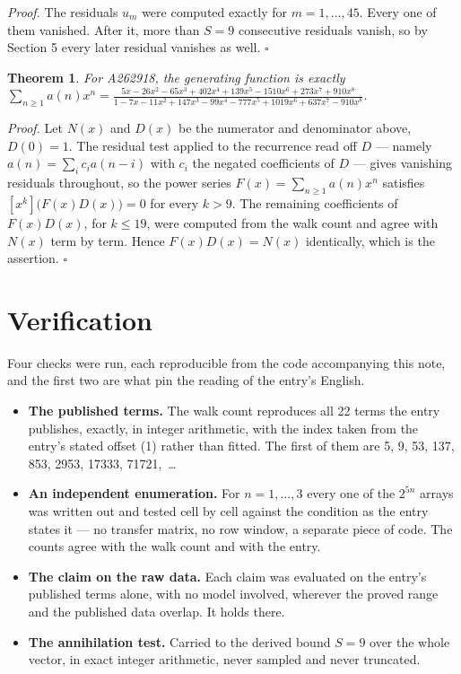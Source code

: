 \documentclass[11pt]{article}
\newtheorem{theorem}{Theorem}
\theoremstyle{definition}
\begin{document}
{\itshape Proof.} The residuals $u_m$ were computed exactly for $m = 1,\dots,45$. Every one of them vanished. After it, more than $S = 9$ consecutive residuals vanish, so by Section 5 every later residual vanishes as well. $\square$

\begin{theorem} For A262918, the generating function is exactly $\sum_{n\ge 1} a(n)x^n = \frac{5x - 26x^{2} - 65x^{3} + 402x^{4} + 139x^{5} - 1510x^{6} + 273x^{7} + 910x^{8}}{1 - 7x - 11x^{2} + 147x^{3} - 99x^{4} - 777x^{5} + 1019x^{6} + 637x^{7} - 910x^{8}}$.\end{theorem}

{\itshape Proof.} Let $N(x)$ and $D(x)$ be the numerator and denominator above, $D(0)=1$. The residual test applied to the recurrence read off $D$ --- namely $a(n) = \sum_i c_i a(n-i)$ with $c_i$ the negated coefficients of $D$ --- gives vanishing residuals throughout, so the power series $F(x)=\sum_{n\ge 1}a(n)x^n$ satisfies $[x^k]\bigl(F(x)D(x)\bigr) = 0$ for every $k > 9$. The remaining coefficients of $F(x)D(x)$, for $k \le 19$, were computed from the walk count and agree with $N(x)$ term by term. Hence $F(x)D(x) = N(x)$ identically, which is the assertion. $\square$

\section{Verification}

Four checks were run, each reproducible from the code accompanying this note, and the first two are what pin the reading of the entry's English.

\begin{itemize}

\item {\bfseries The published terms.} The walk count reproduces all 22 terms the entry publishes, exactly, in integer arithmetic, with the index taken from the entry's stated offset (1) rather than fitted. The first of them are 5, 9, 53, 137, 853, 2953, 17333, 71721,~\dots

\item {\bfseries An independent enumeration.} For $n = 1,\dots,3$ every one of the $2^{5n}$ arrays was written out and tested cell by cell against the condition as the entry states it --- no transfer matrix, no row window, a separate piece of code. The counts agree with the walk count and with the entry.

\item {\bfseries The claim on the raw data.} Each claim was evaluated on the entry's published terms alone, with no model involved, wherever the proved range and the published data overlap. It holds there.

\item {\bfseries The annihilation test.} Carried to the derived bound $S = 9$ over the whole vector, in exact integer arithmetic, never sampled and never truncated.

\end{itemize}
\end{document}
